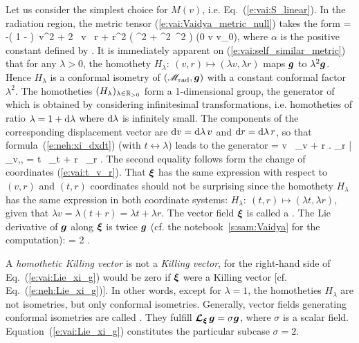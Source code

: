 Let us consider the simplest choice for $M(v)$, i.e.
Eq.~(\ref{e:vai:S_linear}).
In the radiation region, the metric tensor (\ref{e:vai:Vaidya_metric_null})
takes the form
\be \label{e:vai:self_similar_metric}
     = -\left( 1 - \alpha {} \right)\, \dd v^2
            + 2 \, \dd v \, \dd r
        + r^2 \left( \dd\th^2 + \sin^2\th\, \dd\ph^2 \right) \qquad
        (0 \leq v \leq v_0),
\ee
where $\alpha$ is the positive constant defined by
\be \label{e:vai:def_alpha}
   .
\ee
It is immediately apparent on (\ref{e:vai:self_similar_metric})
that for any $\lambda > 0$, the homothety $H_\lambda:\ (v, r) \mapsto (\lambda v, \lambda r)$
maps $\bm{g}$ to $\lambda^2 \bm{g}$. Hence $H_\lambda$ is a
conformal isometry of
$(\mathscr{M}_{\rm rad},\bm{g})$ with a constant conformal factor $\lambda^2$. The homotheties $(H_\lambda)_{\lambda\in \mathbb{R}_{>0}}$
form a 1-dimensional
group, the generator of which is obtained by considering infinitesimal transformations,
i.e. homotheties of ratio $\lambda = 1 + \mathrm{d}\lambda$ where $\mathrm{d}\lambda$ is
infinitely small. The components of the corresponding displacement vector are $\mathrm{d} v = \mathrm{d}\lambda \, v$
and $\mathrm{d} r = \mathrm{d}\lambda\,  r$, so that formula~(\ref{e:neh:xi_dxdt}) (with $t \leftrightarrow \lambda$)
leads to the generator
\be \label{e:vai:hom_Killing}
    \w{\xi} = v \, \wpar_v + r \left. \wpar_r \right| _{v,\th,\ph}
            = t \, \wpar_t + r \, \wpar_r .
\ee
The second equality follows form the change of coordinates (\ref{e:vai:t_v_r}).
That $\bm{\xi}$ has the same expression with respect to $(v, r)$ and $(t, r)$
coordinates should not be surprising since the homothety $H_\lambda$ has the
same expression in both coordinate systems:  $H_\lambda:\ (t, r) \mapsto (\lambda t, \lambda r)$,
given that $\lambda v = \lambda(t + r) = \lambda t + \lambda r$.
The vector field $\bm{\xi}$ is called a
.
The Lie derivative of $\bm{g}$ along $\bm{\xi}$ is twice $\bm{g}$ (cf. the notebook~\ref{s:sam:Vaidya}
for the computation):
\be \label{e:vai:Lie_xi_g}
    \Lie{\xi}  = 2  .
\ee

\begin{remark}
A \emph{homothetic Killing vector} is not a \emph{Killing vector},
for the right-hand side of Eq.~(\ref{e:vai:Lie_xi_g}) would be zero if
$\bm{\xi}$ were a Killing vector [cf. Eq.~(\ref{e:neh:Lie_xi_g})].
In other words, except for $\lambda=1$, the homotheties $H_\lambda$ are not isometries,
but only conformal isometries.
Generally, vector fields generating conformal isometries are
called .
They fulfill $\bm{\mathcal{L}}_{\bm{\xi}}\, \bm{g} = \sigma \bm{g}$, where $\sigma$ is a scalar field.
Equation~(\ref{e:vai:Lie_xi_g}) constitutes the particular subcase $\sigma = 2$.
\end{remark}


